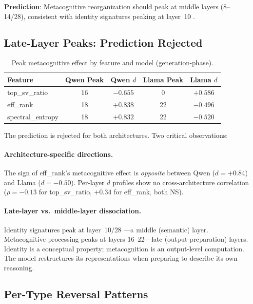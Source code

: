 \documentclass[11pt,a4paper]{article}
\begin{document}
\textbf{Prediction}: Metacognitive reorganization should peak at middle
layers (8--14/28), consistent with identity signatures peaking at
layer~10 \citep{lyra2026campaign2}.

\subsection{Late-Layer Peaks: Prediction Rejected}

\begin{table}[H]
\centering
\caption{Peak metacognitive effect by feature and model (generation-phase).}
\label{tab:study1_peaks}
\begin{tabular}{lcccc}
\toprule
\textbf{Feature} & \textbf{Qwen Peak} & \textbf{Qwen $d$} & \textbf{Llama Peak} & \textbf{Llama $d$} \\
\midrule
top\_sv\_ratio    & 16 & $-0.655$ & 0  & $+0.586$ \\
eff\_rank         & 18 & $+0.838$ & 22 & $-0.496$ \\
spectral\_entropy & 18 & $+0.832$ & 22 & $-0.520$ \\
\bottomrule
\end{tabular}
\end{table}

The prediction is rejected for both architectures. Two critical
observations:

\paragraph{Architecture-specific directions.} The sign of eff\_rank's
metacognitive effect is \emph{opposite} between Qwen ($d = +0.84$) and
Llama ($d = -0.50$). Per-layer $d$ profiles show no cross-architecture
correlation ($\rho = -0.13$ for top\_sv\_ratio, $+0.34$ for eff\_rank,
both NS).

\paragraph{Late-layer vs.\ middle-layer dissociation.} Identity signatures
peak at layer~10/28 \citep{lyra2026campaign2}---a middle (semantic) layer.
Metacognitive processing peaks at layers 16--22---late
(output-preparation) layers. Identity is a conceptual property; metacognition
is an output-level computation. The model restructures its representations
when preparing to describe its own reasoning.

\subsection{Per-Type Reversal Patterns}
\end{document}
